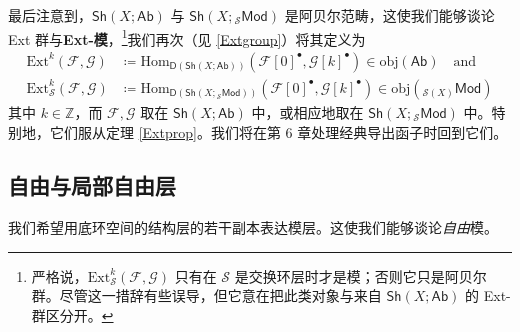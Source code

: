 最后注意到，$\mathsf{Sh}(X;\mathsf{Ab})$ 与 $\mathsf{Sh}(X;{}_{\mathcal{S}}\mathsf{Mod})$ 是阿贝尔范畴，这使我们能够谈论 Ext 群与\textbf{Ext-模}，\footnote{严格说，$\text{Ext}_{\mathcal{S}}^k(\mathcal{F},\mathcal{G})$ 只有在 $\mathcal{S}$ 是交换环层时才是模；否则它只是阿贝尔群。尽管这一措辞有些误导，但它意在把此类对象与来自 $\mathsf{Sh}(X;\mathsf{Ab})$ 的 Ext-群区分开。}我们再次（见 \eqref{Extgroup}）将其定义为
\begin{equation}\label{Extmodules}
\begin{aligned}
	\text{Ext}^k(\mathcal{F},\mathcal{G})&\coloneqq\text{Hom}_{\mathsf{D}(\mathsf{Sh}(X;\mathsf{Ab}))}(\mathcal{F}[0]^\bullet,\mathcal{G}[k]^\bullet)\in\text{obj}(\mathsf{Ab})\quad\text{and} \\
	\text{Ext}_{\mathcal{S}}^k(\mathcal{F},\mathcal{G})&\coloneqq\text{Hom}_{\mathsf{D}(\mathsf{Sh}(X;{}_{\mathcal{S}}\mathsf{Mod}))}(\mathcal{F}[0]^\bullet,\mathcal{G}[k]^\bullet)\in\text{obj}({}_{\mathcal{S}(\!X\!)}\!\mathsf{Mod})
\end{aligned}
\end{equation}
其中 $k\in\mathbb{Z}$，而 $\mathcal{F},\mathcal{G}$ 取在 $\mathsf{Sh}(X;\mathsf{Ab})$ 中，或相应地取在 $\mathsf{Sh}(X;{}_{\mathcal{S}}\mathsf{Mod})$ 中。特别地，它们服从定理 \ref{Extprop}。我们将在第 6 章处理经典导出函子时回到它们。


\subsection{自由与局部自由层}\label{ch5.4}  


我们希望用底环空间的结构层的若干副本表达模层。这使我们能够谈论\textit{自由}模。

